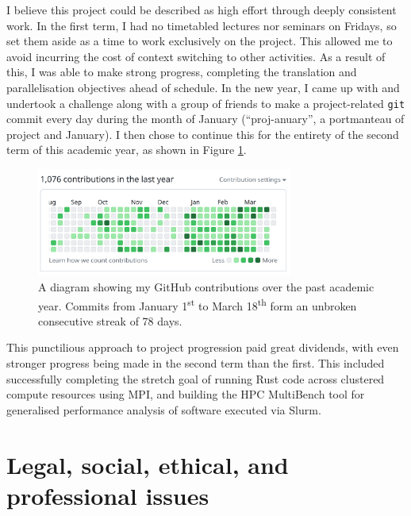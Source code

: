 I believe this project could be described as high effort through deeply consistent work. In the first term, I had no timetabled lectures nor seminars on Fridays, so set them aside as a time to work exclusively on the project. This allowed me to avoid incurring the cost of context switching to other activities. As a result of this, I was able to make strong progress, completing the translation and parallelisation objectives ahead of schedule. In the new year, I came up with and undertook a challenge along with a group of friends to make a project-related \texttt{git} commit every day during the month of January (``proj-anuary'', a portmanteau of project and January). I then chose to continue this for the entirety of the second term of this academic year, as shown in Figure \ref{fig:github_year_long_contributions}.

\begin{figure}[h]
    \centering
    \includegraphics[width=0.75\textwidth]{images/6_project_management/github_year_long_contributions.png}
    \caption{A diagram showing my GitHub contributions over the past academic year. Commits from January 1\textsuperscript{st} to March 18\textsuperscript{th} form an unbroken consecutive streak of 78 days.}
    \label{fig:github_year_long_contributions}
\end{figure}

This punctilious approach to project progression paid great dividends, with even stronger progress being made in the second term than the first. This included successfully completing the stretch goal of running Rust code across clustered compute resources using MPI, and building the HPC MultiBench tool for generalised performance analysis of software executed via Slurm.

\section{Legal, social, ethical, and professional issues}
\label{sec:legal-social-ethical-professional-issues}

